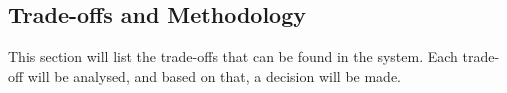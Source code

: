 \subsection{Trade-offs and Methodology} 
\label{ssec:trade_offs_and_methodology}
This section will list the trade-offs that can be found in the system. Each trade-off will be analysed, and based on that, a decision will be made.















% 










